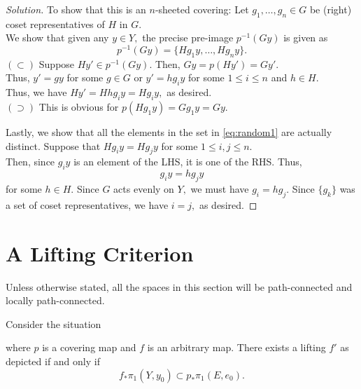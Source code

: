 \documentclass[12pt]{article}
\newenvironment{soln}{\begin{proof}[Solution]}{\end{proof}}
\begin{document}
\begin{soln}
	To show that this is an $n$-sheeted covering: Let $g_1, \ldots, g_n \in G$ be (right) coset representatives of $H$ in $G.$\\
	We show that given any $y \in Y,$ the precise pre-image $p^{-1}(Gy)$ is given as
	\begin{equation} \tag{$*$} \label{eq:random1}
		p^{-1}(Gy) = \{Hg_1y, \ldots, Hg_ny\}.
	\end{equation}
	$(\subset)$ Suppose $Hy' \in p^{-1}(Gy).$ Then, $Gy = p(Hy') = Gy'.$\\
	Thus, $y' = gy$ for some $g \in G$ or $y' = hg_iy$ for some $1 \le i \le n$ and $h \in H.$\\
	Thus, we have $Hy' = Hhg_iy = Hg_iy,$ as desired.\\
	$(\supset)$ This is obvious for $p(Hg_1y) = Gg_1y = Gy.$

	Lastly, we show that all the elements in the set in \cref{eq:random1} are actually distinct. Suppose that $Hg_iy = Hg_jy$ for some $1 \le i, j \le n.$\\
	Then, since $g_iy$ is an element of the LHS, it is one of the RHS. Thus,
	\begin{equation*} 
		g_iy = hg_jy
	\end{equation*}
	for some $h \in H.$ Since $G$ acts evenly on $Y,$ we must have $g_i = hg_j.$ Since $\{g_k\}$ was a set of coset representatives, we have $i = j,$ as desired.
\end{soln}
%
\section{A Lifting Criterion}
Unless otherwise stated, all the spaces in this section will be path-connected and locally path-connected.

\begin{thm} \label{thm:liftcriterion}
	Consider the situation	
	\begin{center}
	\end{center}
	where $p$ is a covering map and $f$ is an arbitrary map. There exists a lifting $f'$ as depicted if and only if 
	\begin{equation*} 
		f_*\pi_1(Y, y_0) \subset p_*\pi_1(E, e_0).
	\end{equation*}
\end{thm}
\end{document}

